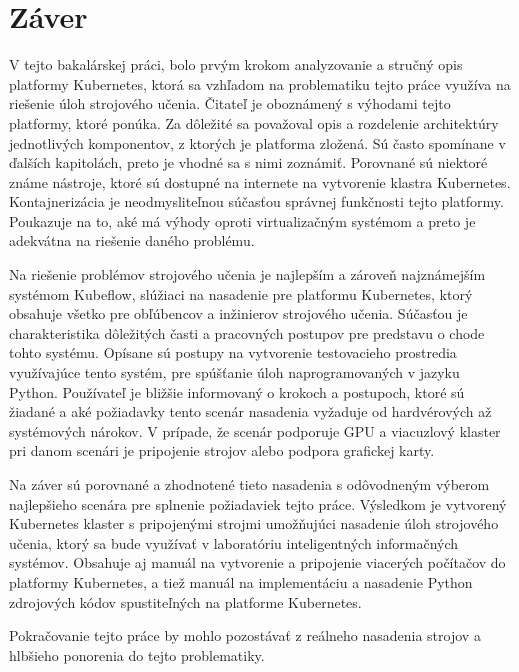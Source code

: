 
\chapter{Záver}
\label{summary}

V tejto bakalárskej práci, bolo prvým krokom analyzovanie a stručný opis platformy Kubernetes, ktorá sa vzhľadom na problematiku tejto práce využíva na riešenie úloh strojového učenia. Čitateľ je oboznámený s výhodami tejto platformy, ktoré ponúka. Za dôležité sa považoval opis a rozdelenie architektúry jednotlivých komponentov, z ktorých je platforma zložená. Sú často spomínane v ďalších kapitolách, preto je vhodné sa s nimi zoznámiť. Porovnané sú niektoré známe nástroje, ktoré sú dostupné na internete na vytvorenie klastra Kubernetes. Kontajnerizácia je neodmysliteľnou súčasťou správnej funkčnosti tejto platformy. Poukazuje na to, aké má výhody oproti virtualizačným systémom a preto je adekvátna na riešenie daného problému.

Na riešenie problémov strojového učenia je najlepším a zároveň najznámejším systémom Kubeflow, slúžiaci na nasadenie pre platformu Kubernetes, ktorý obsahuje všetko pre obľúbencov a inžinierov strojového učenia. Súčasťou je charakteristika dôležitých časti a pracovných postupov pre predstavu o chode tohto systému. Opísane sú postupy na vytvorenie testovacieho prostredia využívajúce tento systém, pre spúšťanie úloh naprogramovaných v jazyku Python. Používateľ je bližšie informovaný o krokoch a postupoch, ktoré sú žiadané a aké požiadavky tento scenár nasadenia vyžaduje od hardvérových až systémových nárokov. V prípade, že scenár podporuje GPU a viacuzlový klaster pri danom scenári je pripojenie strojov alebo podpora grafickej karty.

Na záver sú porovnané a zhodnotené tieto nasadenia s odôvodneným výberom najlepšieho scenára pre splnenie požiadaviek tejto práce. Výsledkom je vytvorený Kubernetes klaster s pripojenými strojmi umožňujúci nasadenie úloh strojového učenia, ktorý sa bude využívať v laboratóriu inteligentných informačných systémov. Obsahuje aj manuál na vytvorenie a pripojenie viacerých počítačov do platformy Kubernetes, a tiež manuál na implementáciu a nasadenie Python zdrojových kódov spustiteľných na platforme Kubernetes.

Pokračovanie tejto práce by mohlo pozostávať z reálneho nasadenia strojov a hlbšieho ponorenia do tejto problematiky.